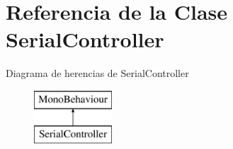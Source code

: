 \hypertarget{class_serial_controller}{}\section{Referencia de la Clase Serial\+Controller}
\label{class_serial_controller}
Diagrama de herencias de Serial\+Controller\begin{figure}[H]
\begin{center}
\leavevmode
\includegraphics[height=2.000000cm]{class_serial_controller}
\end{center}
\end{figure}
